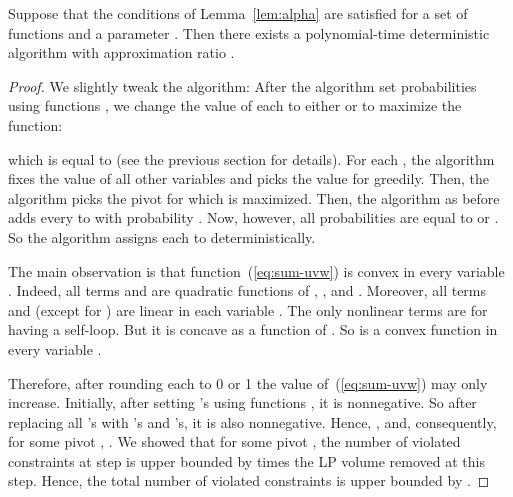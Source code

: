 \documentclass[11pt]{article}
\theoremstyle{definition}
\theoremstyle{remark}
\begin{document}
\begin{theorem}
Suppose that the conditions of Lemma~\ref{lem:alpha} are satisfied for a set of functions 
and a parameter . Then there exists a polynomial-time deterministic algorithm with approximation ratio
.
\end{theorem}
\begin{proof}
We slightly tweak the algorithm: After the algorithm set probabilities  using functions ,
we change the value of each  to either  or  to maximize the function:

which is equal to (see the previous section for details).
For each , the algorithm fixes the value of all other variables  and picks the value for  greedily.
Then, the algorithm picks the pivot  for which 
is maximized. Then, the algorithm as before adds every  to  with probability .
Now, however, all probabilities  are equal to  or . So the algorithm assigns each  to  deterministically.

The main observation is that function~(\ref{eq:sum-uvw}) is convex in every variable . Indeed, all terms
 and  are quadratic functions of , , and . Moreover,
all terms  and  (except for ) are linear in each variable . The only nonlinear terms are
 for  having a self-loop. But it is concave as a function of . So  is a convex function in every variable
.

Therefore, after rounding each  to 0 or 1 the value of~(\ref{eq:sum-uvw}) may only increase. Initially, after setting 's using functions , it is nonnegative. So after replacing all 's with 's and 's, it is also nonnegative. Hence, , and,
consequently, for some pivot , . We showed that for some pivot , the number
of violated constraints at step  is upper bounded by  times the LP volume removed at this step. Hence, the total number of violated constraints
is upper bounded by .
\end{proof}

 
\end{document}
